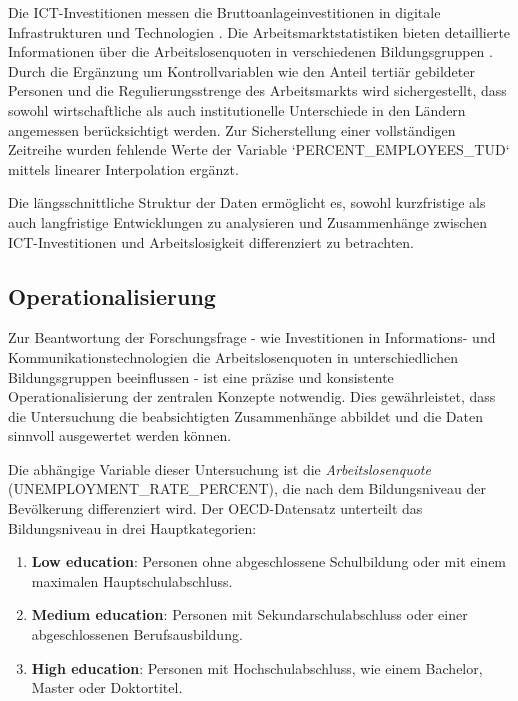 Die \ac{ICT}-Investitionen messen die Bruttoanlageinvestitionen in digitale Infrastrukturen 
und Technologien \parencite{oecd2022ict}. Die Arbeitsmarktstatistiken bieten detaillierte 
Informationen über die Arbeitslosenquoten in verschiedenen Bildungsgruppen 
\parencite{oecd2022unemployment}. Durch die Ergänzung um Kontrollvariablen wie den Anteil 
tertiär gebildeter Personen und die Regulierungsstrenge des Arbeitsmarkts wird sichergestellt, 
dass sowohl wirtschaftliche als auch institutionelle Unterschiede in den Ländern angemessen 
berücksichtigt werden. Zur Sicherstellung einer vollständigen Zeitreihe wurden fehlende Werte 
der Variable `PERCENT\_EMPLOYEES\_TUD` mittels linearer Interpolation ergänzt.  

Die längsschnittliche Struktur der Daten ermöglicht es, sowohl kurzfristige als auch 
langfristige Entwicklungen zu analysieren und Zusammenhänge zwischen ICT-Investitionen und 
Arbeitslosigkeit differenziert zu betrachten.



\subsection{Operationalisierung}

Zur Beantwortung der Forschungsfrage - wie Investitionen in Informations- und 
Kommunikationstechnologien die Arbeitslosenquoten in unterschiedlichen Bildungsgruppen 
beeinflussen - ist eine präzise und konsistente Operationalisierung der zentralen Konzepte 
notwendig. Dies gewährleistet, dass die Untersuchung die beabsichtigten Zusammenhänge abbildet 
und die Daten sinnvoll ausgewertet werden können.

Die abhängige Variable dieser Untersuchung ist die \textit{Arbeitslosenquote} 
(UNEMPLOYMENT\_RATE\_PERCENT), die nach dem Bildungsniveau der Bevölkerung differenziert wird. 
Der \ac{OECD}-Datensatz unterteilt das Bildungsniveau in drei Hauptkategorien:

\begin{enumerate}
    \item \textbf{Low education}: Personen ohne abgeschlossene Schulbildung oder mit 
    einem maximalen Hauptschulabschluss.
    \item \textbf{Medium education}: Personen mit Sekundarschulabschluss oder einer 
    abgeschlossenen Berufsausbildung.
    \item \textbf{High education}: Personen mit Hochschulabschluss, wie einem Bachelor, 
    Master oder Doktortitel.
\end{enumerate}

